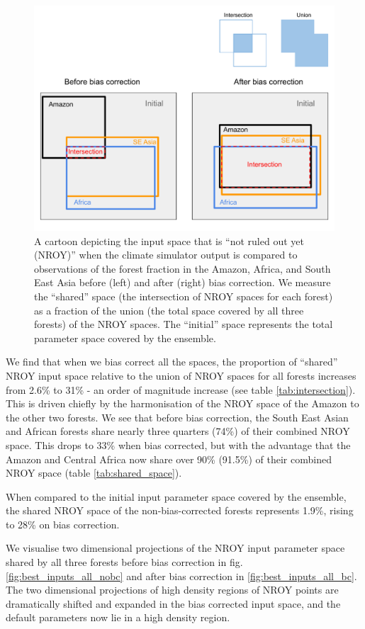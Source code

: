 \documentclass[gmd, manuscript]{copernicus}
\begin{document}
\begin{figure}[t]
\includegraphics[width=12cm]{../graphics/NROY_cartoon.pdf}
\caption{A cartoon depicting the input space that is ``not ruled out yet (NROY)'' when the climate simulator output is compared to observations of the forest fraction in the Amazon, Africa, and South East Asia before (left) and after (right) bias correction. We measure the ``shared'' space (the intersection of NROY spaces for each forest) as a fraction of the union (the total space covered by all three forests) of the NROY spaces. The ``initial'' space represents the total parameter space covered by the ensemble.
}
\label{fig:NROY_cartoon}
\end{figure}


We find that when we bias correct all the spaces, the proportion of ``shared'' NROY input space relative to the union of NROY spaces for all forests increases from 2.6\% to 31\% - an order of magnitude increase (see table \ref{tab:intersection}). This is driven chiefly by the harmonisation of the NROY space of the Amazon to the other two forests. We see that before bias correction, the South East Asian and African forests share nearly three quarters (74\%) of their combined NROY space. This drops to 33\% when bias corrected, but with the advantage that the Amazon and Central Africa now share over 90\% (91.5\%) of their combined NROY space (table \ref{tab:shared_space}). 

When compared to the initial input parameter space covered by the ensemble, the shared NROY space of the non-bias-corrected forests represents 1.9\%, rising to 28\% on bias correction.

We visualise two dimensional projections of the NROY input parameter space shared by all three forests before bias correction in fig. \ref{fig:best_inputs_all_nobc} and after bias correction in \ref{fig:best_inputs_all_bc}. The two dimensional projections of high density regions of NROY points are dramatically shifted and expanded in the bias corrected input space, and the default parameters now lie in a high density region.
\end{document}
